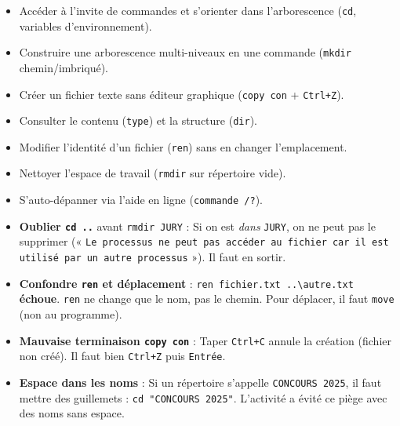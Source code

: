 \documentclass[11pt]{article}
\newcommand{\cle}[1]{{\popxbold\color{popdark}#1}}
\begin{document}
\begin{aretenir}
\begin{itemize}
    \item \cle{Accéder} à l'invite de commandes et s'orienter dans l'arborescence (\texttt{cd}, variables d'environnement).
    \item \cle{Construire} une arborescence multi-niveaux en une commande (\texttt{mkdir} chemin/imbriqué).
    \item \cle{Créer} un fichier texte sans éditeur graphique (\texttt{copy con} + \texttt{Ctrl+Z}).
    \item \cle{Consulter} le contenu (\texttt{type}) et la structure (\texttt{dir}).
    \item \cle{Modifier} l'identité d'un fichier (\texttt{ren}) sans en changer l'emplacement.
    \item \cle{Nettoyer} l'espace de travail (\texttt{rmdir} sur répertoire vide).
    \item \cle{S'auto-dépanner} via l'aide en ligne (\texttt{commande /?}).
\end{itemize}
\end{aretenir}

\begin{attention}
\begin{itemize}
    \item \textbf{Oublier \texttt{cd ..}} avant \texttt{rmdir JURY} : Si on est \emph{dans} \texttt{JURY}, on ne peut pas le supprimer (« \texttt{Le processus ne peut pas accéder au fichier car il est utilisé par un autre processus} »). Il faut en sortir.
    \item \textbf{Confondre \texttt{ren} et déplacement} : \texttt{ren fichier.txt ..\textbackslash autre.txt} \textbf{échoue}. \texttt{ren} ne change que le nom, pas le chemin. Pour déplacer, il faut \texttt{move} (non au programme).
    \item \textbf{Mauvaise terminaison \texttt{copy con}} : Taper \texttt{Ctrl+C} annule la création (fichier non créé). Il faut bien \texttt{Ctrl+Z} puis \texttt{Entrée}.
    \item \textbf{Espace dans les noms} : Si un répertoire s'appelle \texttt{CONCOURS 2025}, il faut mettre des guillemets : \texttt{cd "CONCOURS 2025"}. L'activité a évité ce piège avec des noms sans espace.
\end{itemize}
\end{attention}

\newpage
\end{document}
